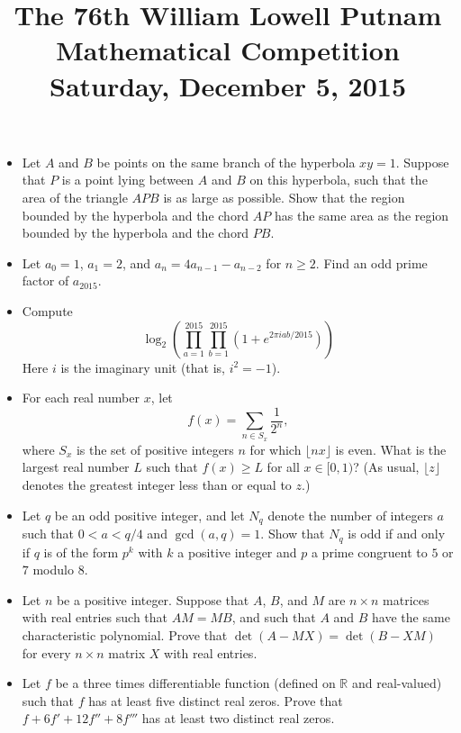 \documentclass[amssymb,twocolumn,pra,10pt,aps]{revtex4-1}
\begin{document}
\title{The 76th William Lowell Putnam Mathematical Competition \\
    Saturday, December 5, 2015}
\maketitle

\begin{itemize}

\item[A1] 
Let $A$ and $B$ be points on the same branch of the hyperbola $xy=1$. Suppose that $P$ is a point lying between $A$ and $B$ on this hyperbola, such that the area of the triangle $APB$ is as large as possible. Show that the region bounded by the hyperbola and the chord $AP$ has the same area as the region bounded by the hyperbola and the chord $PB$.

\item[A2]
Let $a_0=1$, $a_1=2$, and $a_n=4a_{n-1}-a_{n-2}$ for $n\geq 2$. Find an odd prime factor of $a_{2015}$.

\item[A3]
Compute
\[
\log_2 \left( \prod_{a=1}^{2015} \prod_{b=1}^{2015} (1+e^{2\pi i a b/2015}) \right)
\]
Here $i$ is the imaginary unit (that is, $i^2=-1$). 

\item[A4]
For each real number $x$, let
\[
f(x) = \sum_{n\in S_x} \frac{1}{2^n},
\]
where $S_x$ is the set of positive integers $n$ for which $\lfloor nx \rfloor$ is even. What is the largest real number $L$ such that $f(x) \geq L$ for all $x \in [0,1)$? (As usual, $\lfloor z \rfloor$ denotes the greatest integer less than or equal to $z$.)

\item[A5]
Let $q$ be an odd positive integer, and let $N_q$ denote the number of integers $a$ such that $0 < a < q/4$ and $\gcd(a,q) = 1$. Show that $N_q$ is odd if and only if $q$ is of the form $p^k$ with $k$ a positive integer and $p$ a prime congruent to $5$ or $7$ modulo $8$.

\item[A6]
Let $n$ be a positive integer. Suppose that $A$, $B$, and $M$ are $n\times n$ matrices with real entries such that $AM = MB$, and such that $A$ and $B$ have the same characteristic polynomial. Prove that $\det(A-MX) = \det(B-XM)$ for every $n\times n$ matrix $X$ with real entries. 

\item[B1]
Let $f$ be a three times differentiable function (defined on $\mathbb{R}$ and real-valued) such that $f$ has at least five distinct real zeros. Prove that $f + 6f' + 12f'' + 8f'''$ has at least two distinct real zeros.


\end{itemize}
\end{document}
